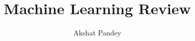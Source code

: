 \documentclass[titlepage]{article}
\title{Machine Learning Review}
\author{Akshat Pandey}
\date{}
\begin{document}
\maketitle

\tableofcontents\newpage

\newpage
\newpage
\newpage
\newpage


\newpage
{}

\end{document}
